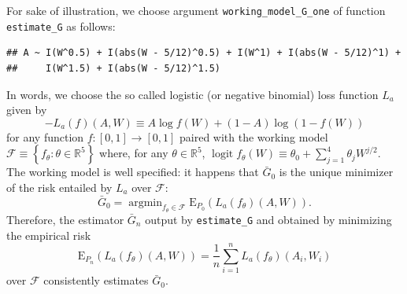 \documentclass[]{article}
\newenvironment{Shaded}{\begin{snugshade}}{\end{snugshade}}
\newcommand{\ControlFlowTok}[1]{\textcolor[rgb]{0.13,0.29,0.53}{\textbf{#1}}}
\newcommand{\DataTypeTok}[1]{\textcolor[rgb]{0.13,0.29,0.53}{#1}}
\newcommand{\DecValTok}[1]{\textcolor[rgb]{0.00,0.00,0.81}{#1}}
\newcommand{\KeywordTok}[1]{\textcolor[rgb]{0.13,0.29,0.53}{\textbf{#1}}}
\newcommand{\NormalTok}[1]{#1}
\newcommand{\OperatorTok}[1]{\textcolor[rgb]{0.81,0.36,0.00}{\textbf{#1}}}
\newcommand{\OtherTok}[1]{\textcolor[rgb]{0.56,0.35,0.01}{#1}}
\newcommand{\StringTok}[1]{\textcolor[rgb]{0.31,0.60,0.02}{#1}}
\DeclareMathOperator{\logit}{logit}
\newcommand{\bbR}{\mathbb{R}}
\newcommand{\calF}{\mathcal{F}}
\newcommand{\Exp}{\textrm{E}}
\newcommand{\Gbar}{\bar{G}}
\theoremstyle{definition}
\theoremstyle{definition}
\theoremstyle{definition}
\theoremstyle{remark}
\begin{document}
For sake of illustration, we choose argument
\texttt{working\_model\_G\_one} of function \texttt{estimate\_G} as
follows:

\begin{Shaded}
\end{Shaded}

\begin{verbatim}
## A ~ I(W^0.5) + I(abs(W - 5/12)^0.5) + I(W^1) + I(abs(W - 5/12)^1) + 
##     I(W^1.5) + I(abs(W - 5/12)^1.5)
\end{verbatim}

In words, we choose the so called logistic (or negative binomial) loss
function \(L_{a}\) given by \begin{equation}    \label{eq:logis:loss}
-L_{a}(f)(A,W) \equiv A \log f(W) + (1 - A) \log (1 - f(W)) \end{equation}
for any function \(f : [0,1] \to [0,1]\) paired with the working model
\(\calF \equiv \left\{f_{\theta} : \theta \in \bbR^{5}\right\}\) where,
for any \(\theta \in \bbR^{5}\),
\(\logit f_{\theta} (W) \equiv \theta_{0} + \sum_{j=1}^{4} \theta_{j} W^{j/2}\).
The working model is well specified: it happens that \(\Gbar_{0}\) is
the unique minimizer of the risk entailed by \(L_{a}\) over \(\calF\):
\begin{equation*}\Gbar_{0} = \mathop{\arg\min}_{f_{\theta} \in \calF}
\Exp_{P_{0}}   \left(L_{a}(f_{\theta})(A,W)\right).\end{equation*}
Therefore, the estimator \(\Gbar_{n}\) output by \texttt{estimate\_G}
and obtained by minimizing the empirical risk
\begin{equation*}        \Exp_{P_{n}}
\left(L_{a}(f_{\theta})(A,W)\right)      =     \frac{1}{n}      \sum_{i=1}^{n}
L_{a}(f_{\theta})(A_{i},W_{i})\end{equation*} over \(\calF\)
consistently estimates \(\Gbar_{0}\).
\end{document}
